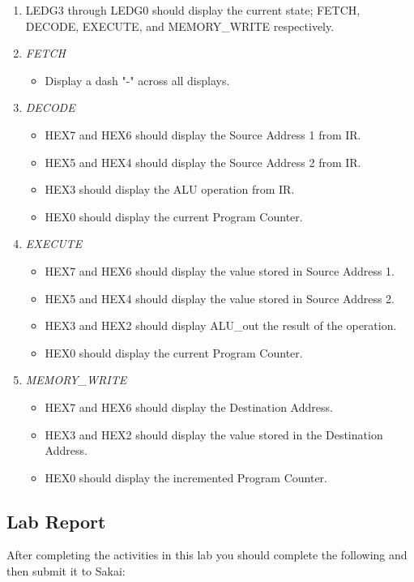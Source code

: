 \begin{enumerate}
	\item LEDG3 through LEDG0 should display the current state; FETCH, DECODE, EXECUTE, and MEMORY\_WRITE respectively. 
	\item \emph{FETCH}
	\begin{itemize}
		 \item Display a dash "-" across all displays.
	\end{itemize}
	\item \emph{DECODE}
	\begin{itemize}
		\item HEX7 and HEX6 should display the Source Address 1 from IR.
		\item HEX5 and HEX4 should display the Source Address 2 from IR.
		\item HEX3 should display the ALU operation from IR.
		\item HEX0 should display the current Program Counter.
	\end{itemize}
	\item \emph{EXECUTE}
	\begin{itemize}
		\item HEX7 and HEX6 should display the value stored in Source Address 1.
		\item HEX5 and HEX4 should display the value stored in Source Address 2.
		\item HEX3 and HEX2 should display ALU\_out the result of the operation.
		\item HEX0 should display the current Program Counter.
	\end{itemize}
	\item \emph{MEMORY\_WRITE}
	\begin{itemize}
		\item HEX7 and HEX6 should display the Destination Address.
		\item HEX3 and HEX2 should display the value stored in the Destination Address.
		\item HEX0 should display the incremented Program Counter.
	\end{itemize}
\end{enumerate}

\subsection{Lab Report}
After completing the activities in this lab you should complete the following and then submit it to Sakai:

